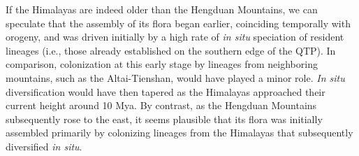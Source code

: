 



If the Himalayas are indeed older than the Hengduan Mountains, we can speculate that the assembly of its flora began earlier, coinciding temporally with orogeny, and was driven initially by a high rate of \textit{in situ} speciation of resident lineages (i.e., those already established on the southern edge of the QTP). In comparison, colonization at this early stage by lineages from neighboring mountains, such as the Altai-Tienshan, would have played a minor role. \textit{In situ} diversification would have then tapered as the Himalayas approached their current height around 10 Mya. By contrast, as the Hengduan Mountains subsequently rose to the east, it seems plausible that its flora was initially assembled primarily by colonizing lineages from the Himalayas that subsequently diversified \textit{in situ}. 

